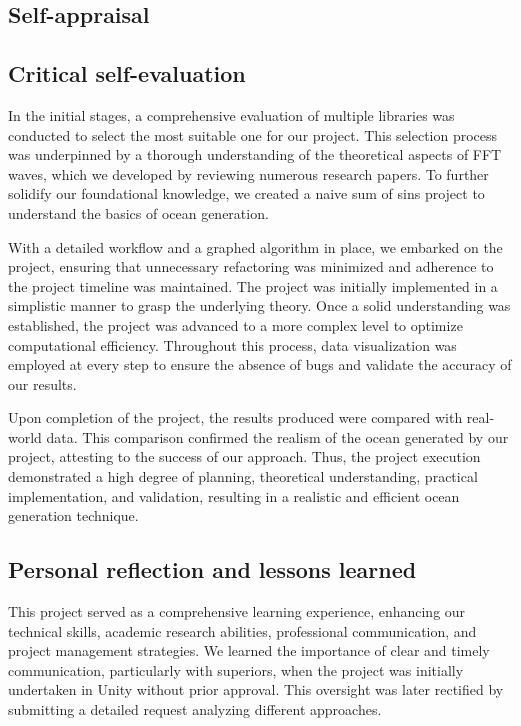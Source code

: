 \begin{appendices}

%
%
\chapter{Self-appraisal}

\section{Critical self-evaluation}

In the initial stages, a comprehensive evaluation of multiple libraries was conducted to select the most suitable one for our project. This selection process was underpinned by a thorough understanding of the theoretical aspects of FFT waves, which we developed by reviewing numerous research papers. To further solidify our foundational knowledge, we created a naive sum of sins project to understand the basics of ocean generation.

With a detailed workflow and a graphed algorithm in place, we embarked on the project, ensuring that unnecessary refactoring was minimized and adherence to the project timeline was maintained. The project was initially implemented in a simplistic manner to grasp the underlying theory. Once a solid understanding was established, the project was advanced to a more complex level to optimize computational efficiency. Throughout this process, data visualization was employed at every step to ensure the absence of bugs and validate the accuracy of our results.

Upon completion of the project, the results produced were compared with real-world data. This comparison confirmed the realism of the ocean generated by our project, attesting to the success of our approach. Thus, the project execution demonstrated a high degree of planning, theoretical understanding, practical implementation, and validation, resulting in a realistic and efficient ocean generation technique.

\section{Personal reflection and lessons learned}

This project served as a comprehensive learning experience, enhancing our technical skills, academic research abilities, professional communication, and project management strategies. We learned the importance of clear and timely communication, particularly with superiors, when the project was initially undertaken in Unity without prior approval. This oversight was later rectified by submitting a detailed request analyzing different approaches.


\end{appendices}
